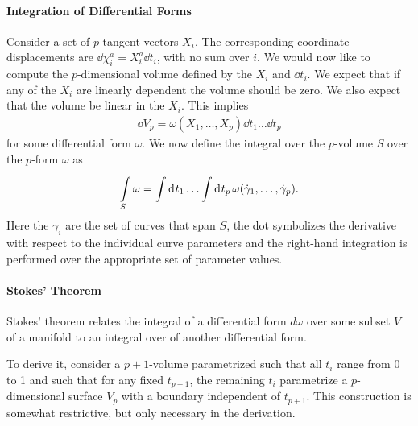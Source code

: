 \paragraph{Integration of Differential Forms}
Consider a set of $p$ tangent vectors $X_{i}$. The corresponding coordinate displacements are $\dd{\chi_{i}^{a}} = X_{i}^{a}\dd{t_{i}}$, with no sum over $i$. We would now like to compute the $p$-dimensional volume defined by the $X_{i}$ and $\dd{t_{i}}$. We expect that if any of the $X_{i}$ are linearly dependent the volume should be zero. We also expect that the volume be linear in the $X_{i}$. This implies
\begin{align*}
	\dd{V_{p}} = \omega(X_{1}, \dots, X_{p})\dd{t_{1}}\dots\dd{t_{p}}
\end{align*}
for some differential form $\omega$. We now define the integral over the $p$-volume $S$ over the $p$-form $\omega$ as
\begin{align*}
	\minteg{S}{\omega} = \integ{}{}{t_{1}}{\dots \integ{}{}{t_{p}}{\omega(\dot{\gamma}_{1},\dots, \dot{\gamma}_{p})}}.
\end{align*}
Here the $\gamma_{i}$ are the set of curves that span $S$, the dot symbolizes the derivative with respect to the individual curve parameters and the right-hand integration is performed over the appropriate set of parameter values.

\paragraph{Stokes' Theorem}
Stokes' theorem relates the integral of a differential form $d\omega$ over some subset $V$ of a manifold to an integral over  of another differential form.

To derive it, consider a $p + 1$-volume parametrized such that all $t_{i}$ range from 0 to 1 and such that for any fixed $t_{p + 1}$, the remaining $t_{i}$ parametrize a $p$-dimensional surface $V_{p}$ with a boundary independent of $t_{p + 1}$. This construction is somewhat restrictive, but only necessary in the derivation.

